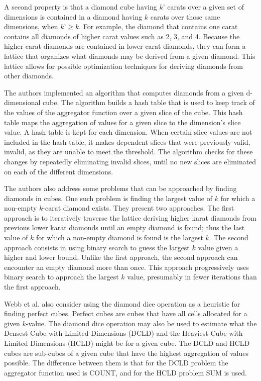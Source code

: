 \documentclass[12pt]{article}
\begin{document}
A second property is that a diamond cube having $k$’ carats over a given set of dimensions is contained in a diamond having $k$ carats over those same
dimensions, when $k’ \geq k$. For example, the diamond that contains one carat contains all diamonds of higher carat values such as 2, 3, and 4. Because the
higher carat diamonds are contained in lower carat diamonds, they can form a lattice that organizes what diamonds may be derived from a given diamond. This
lattice allows for possible optimization techniques for deriving diamonds from other diamonds.

The authors implemented an algorithm that computes diamonds from a given d-dimensional cube. The algorithm builds a hash table that is used to keep track of the
values of the aggregator function over a given slice of the cube. This hash table maps the aggregation of values for a given slice to the dimension’s slice
value. A hash table is kept for each dimension. When certain slice values are not included in the hash table, it makes dependent slices that were previously
valid, invalid, as they are unable to meet the threshold. The algorithm checks for these changes by repeatedly eliminating invalid slices, until no new slices
are eliminated on each of the different dimensions.

The authors also address some problems that can be approached by finding diamonds in cubes. One such problem is finding the largest value of $k$ for which a
non-empty $k$-carat diamond exists. They present two approaches. The first approach is to iteratively traverse the lattice deriving higher karat diamonds from
previous lower karat diamonds until an empty diamond is found; thus the last value of $k$ for which a non-empty diamond is found is the largest $k$. The second
approach consists in using binary search to guess the largest $k$ value given a higher and lower bound. Unlike the first approach, the second approach can
encounter an empty diamond more than once. This approach progressively uses binary search to approach the largest $k$ value, presumably in fewer iterations than
the first approach.

Webb et al. also consider using the diamond dice operation as a heuristic for finding perfect cubes. Perfect cubes are cubes that have all cells allocated for a
given $k$-value. The diamond dice operation may also be used to estimate what the Densest Cube with Limited Dimensions (DCLD) and the Heaviest Cube with Limited
Dimensions (HCLD) might be for a given cube. The DCLD and HCLD cubes are sub-cubes of a given cube that have the highest aggregation of values possible. The
difference between them is that for the DCLD problem the aggregator function used is COUNT, and for the HCLD problem SUM is used.
\end{document}
